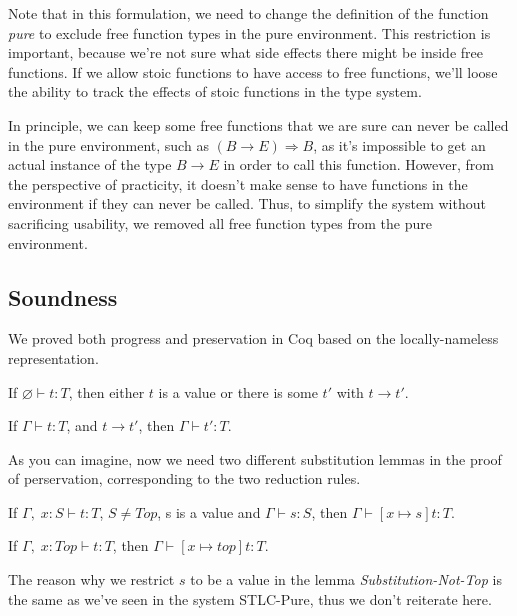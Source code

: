 Note that in this formulation, we need to change the definition of the
function \emph{pure} to exclude free function types in the pure
environment. This restriction is important, because we're not sure
what side effects there might be inside free functions. If we allow
stoic functions to have access to free functions, we'll loose the
ability to track the effects of stoic functions in the type system.

In principle, we can keep some free functions that we are sure can
never be called in the pure environment, such as
$(B \to E) \Rightarrow B$, as it's impossible to get an actual
instance of the type $B \to E$ in order to call this
function. However, from the perspective of practicity, it doesn't make
sense to have functions in the environment if they can never be
called. Thus, to simplify the system without sacrificing usability, we
removed all free function types from the pure environment.

\subsection{Soundness}

We proved both progress and preservation in Coq based on the
locally-nameless representation.

\begin{theorem}[Progress]
If $\varnothing \vdash t : T$, then either $t$ is a value or there is some
$t'$ with $t \longrightarrow t'$.
\end{theorem}

\begin{theorem}[Preservation]
If $\Gamma \vdash t : T$, and $t \longrightarrow t'$, then $\Gamma
\vdash t' : T$.
\end{theorem}

As you can imagine, now we need two different substitution lemmas in
the proof of perservation, corresponding to the two reduction rules.

\begin{lemma}
  If $\Gamma,\; x:S \vdash t : T$, $S \neq Top$, s is a value and
  $\Gamma \vdash s : S$, then $\Gamma \vdash [x \mapsto s]t : T$.
\end{lemma}

\begin{lemma}
  If $\Gamma,\; x:Top \vdash t : T$, then $\Gamma \vdash [x \mapsto top]t : T$.
\end{lemma}

The reason why we restrict $s$ to be a value in the lemma
\emph{Substitution-Not-Top} is the same as we've seen in the system
STLC-Pure, thus we don't reiterate here.

